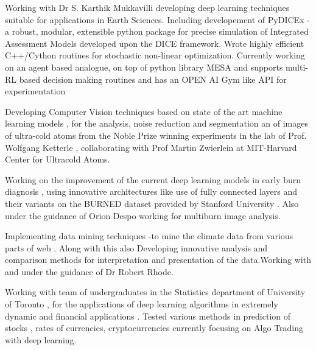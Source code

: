 \documentclass[]{deedy-resume-openfont}
\begin{document}
Working with Dr S. Karthik Mukkavilli developing deep learning techniques suitable for applications in Earth Sciences. Including developement of PyDICEx - a robust, modular, extensible python package for precise simulation
of Integrated Assessment Models developed upon the DICE framework. Wrote highly efficient C++/Cython routines
for stochastic non-linear optimization. Currently working on an agent based analogue, on top of python library MESA and supports multi-RL based decision making routines and has an OPEN AI Gym like API for experimentation

\sectionsep

Developing Computer Vision techniques based on state of the art machine learning models , for the analysis, noise reduction and segmentation an of images of ultra-cold atoms from the Noble Prize winning experiments in the lab of Prof.  Wolfgang Ketterle , collaborating with Prof Martin Zwierlein at MIT-Harvard Center for Ultracold Atoms.

\sectionsep

Working on the improvement of the current deep learning models in early burn diagnosis , using innovative architectures like use of fully connected layers and their variants on the BURNED dataset provided by Stanford University .  Also under the guidance of Orion Despo working for multiburn image analysis.
\sectionsep

Implementing  data mining techniques -to mine the climate data from various parts of web . Along with this also Developing innovative analysis and comparison methods for interpretation and presentation of the data.Working with and under the guidance of Dr Robert Rhode.
\sectionsep

Working with team of  undergraduates in the Statistics department of University of Toronto , for the applications of deep learning algorithms in extremely dynamic and financial applications . Tested various methods in prediction of stocks , rates of currencies, cryptocurrencies currently focusing on Algo Trading with deep learning.
\sectionsep
\end{document}
